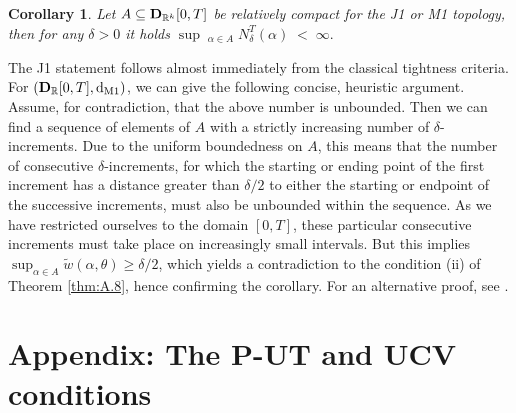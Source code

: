 \documentclass[11pt]{article}
\newtheorem{cor}[theorem]{Corollary}
\theoremstyle{definition}\newtheorem{example}[theorem]{Example}
\theoremstyle{definition}\newtheorem{counterexample}[theorem]{Counterexample}
\theoremstyle{definition}\newtheorem{remark}[theorem]{Remark}
\theoremstyle{definition}\newtheorem{defi}[theorem]{Definition}
\numberwithin{equation}{section}
\newcommand{\R}{\mathbb{R}}
\newcommand{\D}{{\bf D}}											%
\newcommand*\diff{\mathop{}\!\mathrm{d}}								%
\renewcommand{\sup}[1]{\underset{#1}{\operatorname{sup}}\;}					%
\renewcommand{\|}{\; : \, \;}											%
\newcommand{\dJ}{\diff_{\operatorname{J1}}}								%
\newcommand{\dM}{\diff_{\operatorname{M1}}}							%
\begin{document}
\begin{cor} \label{cor:A9}
	Let $A \subseteq \D_{\R^k} [0,T]$ be relatively compact for the J1 or M1 topology, then for any $\delta>0$ it holds
	$ \sup{}_{\!\alpha \in A}\; N^T_\delta(\alpha) \; < \; \infty.$
\end{cor}
The J1 statement follows almost immediately from the classical tightness criteria. For $(\D_\R[0,T], \dM)$, we can give the following concise, heuristic argument. Assume, for contradiction, that the above number is unbounded. Then we can find a sequence of elements of $A$ with a strictly increasing number of $\delta$-increments. Due to the uniform boundedness on $A$, this means that the number of consecutive $\delta$-increments, for which the starting or ending point of the first increment has a distance greater than $\delta/2$ to either the starting or endpoint of the successive increments, must also be unbounded within the sequence. As we have restricted ourselves to the domain $[0,T]$, these particular consecutive increments must take place on increasingly small intervals. But this implies $\operatorname{sup}_{\alpha \in A} \tilde w(\alpha, \theta) \ge \delta/2$, which yields a contradiction to the condition (ii) of Theorem \ref{thm:A.8}, hence confirming the corollary. For an alternative proof, see \cite{balanjakubowski}.



\section{Appendix: The P-UT and UCV conditions}\label{app:UCV_and_PUT}




\end{document}
